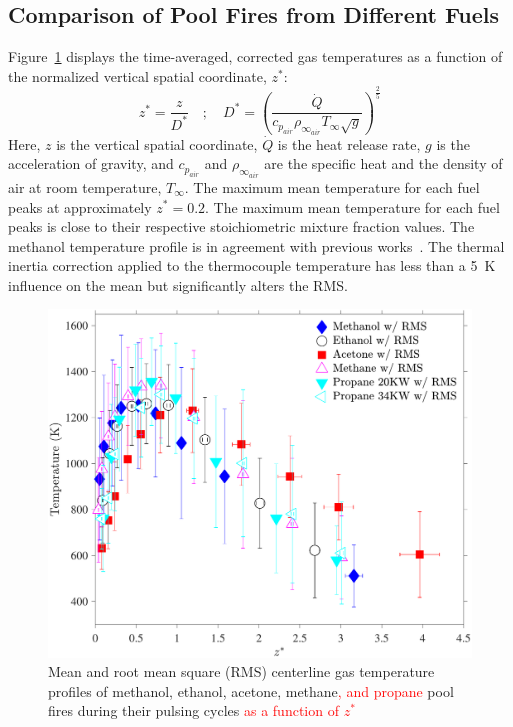 \documentclass[12pt]{article}
\begin{document}
\subsection{Comparison of Pool Fires from Different Fuels}
\label{ssec:Fuel_comp}

Figure~\ref{fig:Temp_Comparison} displays the time-averaged, corrected gas temperatures as a function of the normalized vertical spatial coordinate, $z^*$:
\begin{equation}\label{eq:Z_Star}
z^*=\frac{z}{D^*}  \quad ; \quad  D^* = \left(\frac{\dot{Q}}{c_{p_{air}} \rho_{\infty_{air}} T_\infty \sqrt{g}}\right)^{\frac{2}{5}}
\end{equation}
Here, $z$ is the vertical spatial coordinate, $\dot{Q}$ is the heat release rate, $g$ is the acceleration of gravity, and ${c_{p_{air}}}$ and $\rho_{\infty_{air}}$ are the specific heat and the density of air at room temperature, $T_\infty$. The maximum mean temperature for each fuel peaks at approximately $z^*=0.2$. The maximum mean temperature for each fuel peaks is close to their respective stoichiometric mixture fraction values. The methanol temperature profile is in agreement with previous works~\cite{Wang2019}. The thermal inertia correction applied to the thermocouple temperature has less than a 5~K influence on the mean but significantly alters the RMS.

\begin{figure}[h!]
	\centering
\includegraphics[width=10.0 cm, keepaspectratio]{Temperature_Comparison.pdf}
	\caption[Mean and RMS centerline gas temperature profiles]{Mean and root mean square (RMS) centerline gas temperature profiles of methanol, ethanol, acetone, methane\textcolor{red}{, and propane} pool fires during their pulsing cycles \textcolor{red}{ as a function of $z^*$}}
	\label{fig:Temp_Comparison}
\end{figure}
\end{document}
